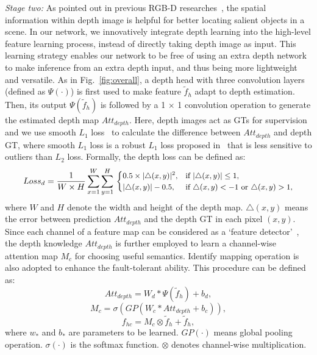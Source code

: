 \documentclass[runningheads]{llncs}
\begin{document}
\emph{ Stage two:} 
As pointed out in previous RGB-D researches~\cite{3DDMRA,3DCPFP}, the spatial information within depth image is helpful for better locating salient objects in a scene.
In our network, we innovatively integrate depth learning into the high-level feature learning process, instead of directly taking depth image as input.
This learning strategy enables our network to be free of using an extra depth network to make inference from an extra depth input,
and thus being more lightweight and versatile.
As in Fig.~\ref{fig:overall}, a depth head with three convolution layers (defined as $\Psi(\cdot)$) is first used to make feature $\widetilde{f}_h$ adapt to depth estimation.
Then, its output $\Psi(\widetilde{f}_h)$ is followed by a 1 $\times$ 1 convolution operation to generate the estimated depth map $Att_{depth}$.
Here, depth images act as GTs for supervision and we use smooth $L_{1}$ loss~\cite{FastRCNN} to calculate the difference between $Att_{depth}$ and depth GT,
where smooth $L_1$ loss is a robust $L_1$ loss proposed in~\cite{FastRCNN} that is less sensitive to outliers than $L_2$ loss.
Formally, the depth loss can be defined as:
\begin{equation}
\begin{small}
Loss_{d} = \frac{1}{W\times H}\sum_{x=1}^W \sum_{y=1}^H\\
\begin{cases} 
0.5\times|\triangle(x,y)|^2, & \text{if }|\triangle(x,y)|\le1, \\
|\triangle(x,y)|-0.5, & \text{if }\triangle(x,y)<-1 \text{ or } \triangle(x,y)>1,
\end{cases}
\end{small}
\end{equation}
where $W$ and $H$ denote the width and height of the depth map. $\triangle(x,y)$ means the error between prediction $Att_{depth}$ and the depth GT in each pixel $(x,y)$.
Since each channel of a feature map can be considered as a ‘feature detector’~\cite{CBAM}, the depth knowledge $Att_{depth}$ is further employed to learn a channel-wise attention map $M_c$ for choosing useful semantics.
Identify mapping operation is also adopted to enhance the fault-tolerant ability.
This procedure can be defined as: 
\begin{equation}
Att_{depth} = W_d*\Psi(\widetilde{f}_h) + b_d,
\end{equation}
\begin{equation}
M_c = \sigma(GP(W_c*Att_{depth}+b_c)),
\end{equation}
\begin{equation}
f_{hc} = M_c\otimes \widetilde{f}_h+\widetilde{f}_h,
\end{equation}
where $w_*$ and $b_*$ are parameters to be learned. $GP(\cdot)$ means global pooling operation. $\sigma(\cdot)$ is the softmax function. $\otimes$ denotes channel-wise multiplication.
\end{document}
